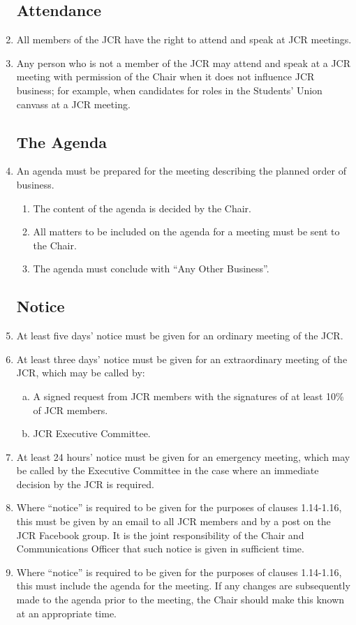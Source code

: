 \documentclass[12pt]{article}
\begin{document}
\begin{enumerate}
    \subsection{Attendance}
    \item All members of the JCR have the right to attend and speak at JCR meetings.
    \item Any person who is not a member of the JCR may attend and speak at a JCR meeting with permission of the Chair when it does not influence JCR business; for example, when candidates for roles in the Students' Union canvass at a JCR meeting.
    \subsection{The Agenda}
    \item An agenda must be prepared for the meeting describing the planned order of business.
    \begin{enumerate}
        \item The content of the agenda is decided by the Chair.
        \item All matters to be included on the agenda for a meeting must be sent to the Chair.
        \item The agenda must conclude with ``Any Other Business''.
    \end{enumerate}
    \subsection{Notice}
    \item At least five days' notice must be given for an ordinary meeting of the JCR.
    \item At least three days' notice must be given for an extraordinary meeting of the JCR, which may be called by:
    \begin{enumerate}[(a)]
        \item A signed request from JCR members with the signatures of at least 10\% of JCR members.
        \item JCR Executive Committee.
    \end{enumerate}
    \item At least 24 hours' notice must be given for an emergency meeting, which may be called by the Executive Committee in the case where an immediate decision by the JCR is required.
    \item Where ``notice'' is required to be given for the purposes of clauses 1.14-1.16, this must be given by an email to all JCR members and by a post on the JCR Facebook group. It is the joint responsibility of the Chair and Communications Officer that such notice is given in sufficient time.
    \item Where ``notice'' is required to be given for the purposes of clauses 1.14-1.16, this must include the agenda for the meeting. If any changes are subsequently made to the agenda prior to the meeting, the Chair should make this known at an appropriate time.

\end{enumerate}
\end{document}
